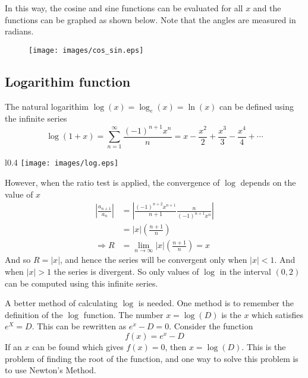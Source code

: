 \documentclass[11pt,a4paper,titlepage,oneside,openany]{article}
\begin{document}
In this way, the cosine and sine functions can be evaluated for all $x$ and the functions can be graphed as shown below. Note that the angles are measured in radians.
\begin{figure}[b]
  \begin{center}
    \texttt{[image: images/cos\_sin.eps]}
  \end{center}
\end{figure}
\pagebreak

\subsection*{Logarithim function}

The natural logarithim $\log(x)=\log_{e}(x)=\ln(x)$ can be defined using the infinite series
\begin{equation*}
  \log(1+x) = \sum_{n=1}^{\infty} \frac{(-1)^{n+1} x^n}{n}=x-\frac{x^2}{2}+\frac{x^3}{3}-\frac{x^4}{4}+ \cdots 
\end{equation*}

\begin{wrapfigure}{l}{0.4\textwidth}
    \texttt{[image: images/log.eps]}
\end{wrapfigure}
However, when the ratio test is applied, the convergence of $\log$ depends on the value of $x$
\begin{align*}
  \left| \frac{a_{n+1}}{a_n}\right|&=\left| \frac{(-1)^{n+2} x^{n+1}}{n+1} \frac{n}{(-1)^{n+1} x^n}\right|\\
&=|x|\left(\frac{n+1}{n}\right)\\
 \Rightarrow R &=\lim_{n \to \infty} |x|\left(\frac{n+1}{n}\right) = x
\end{align*}
And so $R=|x|$, and hence the series will be convergent only when $|x|<1$. And when $|x|>1$ the series is divergent. So only values of $\log$ in the interval $(0,2)$ can be computed using this infinite series.

A better method of calculating $\log$ is needed. One method is to remember the definition of the $\log$ function. The number $x=\log(D)$ is the $x$ which satisfies $e^X=D$. This can be rewritten as $e^x-D=0$. Consider the function
\begin{equation*}
  f(x)=e^x-D
\end{equation*}
If an $x$ can be found which gives $f(x)=0$, then $x=\log(D)$. This is the problem of finding the root of the function, and one way to solve this problem is to use Newton's Method.
\end{document}
